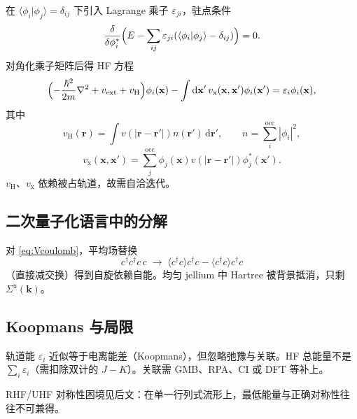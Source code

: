 在 $\langle\phi_i|\phi_j\rangle=\delta_{ij}$ 下引入 Lagrange 乘子 $\varepsilon_{ji}$，驻点条件
\begin{equation}
  \frac{\delta}{\delta\phi_i^*}
  \Bigl(
  E-\sum_{ij}\varepsilon_{ji}(\langle\phi_i|\phi_j\rangle-\delta_{ij})
  \Bigr)
  =0.
\end{equation}
对角化乘子矩阵后得 HF 方程
\begin{equation}
  \Bigl(
  -\frac{\hbar^2}{2m}\nabla^2+v_{\mathrm{ext}}+v_{\mathrm{H}}
  \Bigr)\phi_i(\mathbf{x})
  -\int\mathrm{d}\mathbf{x}'\,
  v_{\mathrm{x}}(\mathbf{x},\mathbf{x}')\phi_i(\mathbf{x}')
  =\varepsilon_i\phi_i(\mathbf{x}),
\end{equation}
其中
\begin{equation}
  v_{\mathrm{H}}(\mathbf{r})
  =\int v(|\mathbf{r}-\mathbf{r}'|)n(\mathbf{r}')\,\mathrm{d}\mathbf{r}',
  \qquad
  n=\sum_i^{\mathrm{occ}}|\phi_i|^2,
\end{equation}
\begin{equation}
  v_{\mathrm{x}}(\mathbf{x},\mathbf{x}')
  =\sum_j^{\mathrm{occ}}
  \phi_j(\mathbf{x})v(|\mathbf{r}-\mathbf{r}'|)\phi_j^*(\mathbf{x}').
\end{equation}
$v_{\mathrm{H}}$、$v_{\mathrm{x}}$ 依赖被占轨道，故需自洽迭代。

\subsection{二次量子化语言中的分解}

对 \eqref{eq:Vcoulomb}，平均场替换
\begin{equation}
  c^\dagger c^\dagger c\,c
  \;\longrightarrow\;
  \langle c^\dagger c\rangle c^\dagger c
  -\langle c^\dagger c\rangle c^\dagger c
\end{equation}
（直接减交换）得到自旋依赖自能。均匀 jellium 中 Hartree 被背景抵消，只剩 $\Sigma^{\mathrm{x}}(\mathbf{k})$。

\subsection{Koopmans 与局限}

轨道能 $\varepsilon_i$ 近似等于电离能差（Koopmans），但忽略弛豫与关联。HF 总能量不是 $\sum_i\varepsilon_i$（需扣除双计的 $J-K$）。关联需 GMB、RPA、CI 或 DFT 等补上。

\begin{note}
RHF/UHF 对称性困境见后文：在单一行列式流形上，最低能量与正确对称性往往不可兼得。
\end{note}
